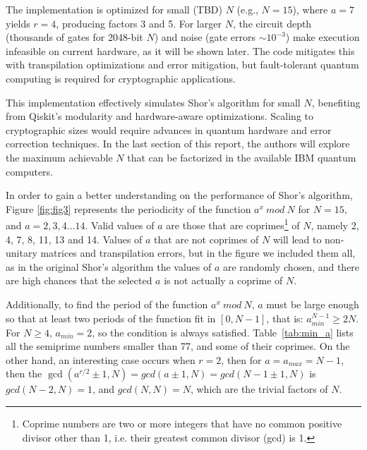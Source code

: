 \documentclass[conference,twoside]{IEEEtran}
\begin{document}
The implementation is optimized for small (TBD) $N$ (e.g., \( N = 15 \)), where \( a = 7 \) yields \( r = 4 \), producing factors 3 and 5. For larger \( N \), the circuit depth (thousands of gates for 2048-bit \( N \)) and noise (gate errors \( \sim 10^{-3} \)) make execution infeasible on current hardware, as it will be shown later. The  code mitigates this with transpilation optimizations and error mitigation, but fault-tolerant quantum computing is required for cryptographic applications.

This implementation effectively simulates Shor's algorithm for small \( N \), benefiting from Qiskit’s modularity and hardware-aware optimizations. Scaling to cryptographic sizes would require advances in quantum hardware and error correction techniques. In the last section of this report, the authors will explore the maximum achievable $N$ that can be factorized in the available IBM quantum computers.

In order to gain a better understanding on the performance of Shor's algorithm, Figure \ref{fig:fig3} represents the periodicity of the function $a^{x} \ mod \ N$ for $N = 15$, and $a = {2, 3, 4... 14}$. Valid values of $a$ are those that are coprimes\footnote{Coprime numbers are two or more integers that have no common positive divisor other than 1, i.e. their greatest common divisor (gcd) is 1.} of $N$, namely 2, 4, 7, 8, 11, 13 and 14. Values of $a$ that are not coprimes of $N$ will lead to non-unitary matrices and transpilation errors, but in the figure we included them all, as in the original Shor's algorithm the values of $a$ are randomly chosen, and there are high chances that the selected $a$ is not actually a coprime of $N$. 

Additionally, to find the period of the function $a^{x} \ mod \ N$, $a$ must be large enough so that at least two periods of the function fit in $[0, N-1]$, that is: $a_{min}^{N-1} \geq 2N $. For $N \geq 4$, $a_{min} = 2$, so the condition is always satisfied. Table~\ref{tab:min_a} lists all the semiprime numbers smaller than 77, and some of their coprimes. On the other hand, an interesting case occurs when $r = 2$, then for $a = a_{max} = N-1$, then the \( \gcd(a^{r/2} \pm 1, N) = gcd(a \pm 1, N) = gcd(N - 1 \pm 1, N)\) is \(gcd(N - 2, N) = 1\), and \(gcd(N, N) = N\), which are the trivial factors of $N$.
\end{document}
